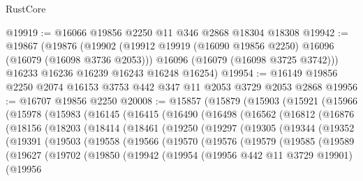 \begin{lexlean}{RustCore}
\begin{coremodule}
@19919 := @16066 @19856 @2250 @11 @346 @2868 @18304 @18308
@19942 := @19867
    (@19876
      (@19902
        (@19912 @19919 (@16090 @19856 @2250) @16096 (@16079 (@16098 @3736 @2053)))
        @16096
        (@16079 (@16098 @3725 @3742)))
      @16233
      @16236
      @16239
      @16243
      @16248
      @16254)
@19954 := @16149 @19856 @2250 @2074 @16153 @3753 @442 @347 @11 @2053 @3729 @2053 @2868
@19956 := @16707 @19856 @2250
@20008 := @15857
    (@15879
      (@15903
        (@15921
          (@15966
            (@15978
              (@15983
                (@16145
                  (@16415
                    (@16490
                      (@16498
                        (@16562
                          (@16812
                            (@16876
                              (@18156
                                (@18203
                                  (@18414
                                    (@18461
                                      (@19250
                                        (@19297
                                          (@19305
                                            (@19344
                                              (@19352
                                                (@19391
                                                  (@19503
                                                    (@19558
                                                      (@19566
                                                        (@19570
                                                          (@19576
                                                            (@19579
                                                              (@19585
                                                                (@19589
                                                                  (@19627
                                                                    (@19702
                                                                      (@19850
                                                                        (@19942
                                                                          (@19954
                                                                            (@19956
                                                                              @442
                                                                              @11
                                                                              @3729
                                                                              @19901)
                                                                            (@19956

\end{coremodule}
\end{lexlean}
